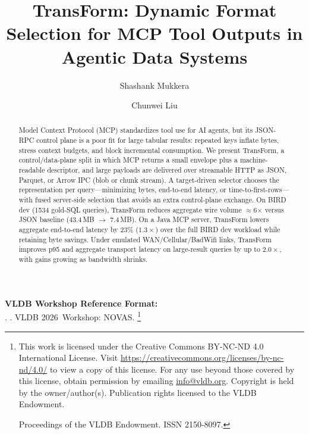 \documentclass[sigconf, nonacm]{acmart}
\newcommand{\system}{TransForm}
\newcommand\vldbyear{2026}
\newcommand\vldbworkshop{NOVAS}
\newcommand\vldbauthors{\authors}
\newcommand\vldbtitle{\shorttitle}
\newcommand\vldbpagestyle{plain}
\begin{document}
\title{\system: Dynamic Format Selection for MCP Tool Outputs in Agentic Data Systems}

\author{Shashank Mukkera}

\author{Chunwei Liu}

\begin{abstract}
Model Context Protocol (MCP) standardizes tool use for AI agents, but its JSON-RPC control plane is a poor fit for large tabular results: repeated keys inflate bytes, stress context budgets, and block incremental consumption. We present \system, a control/data-plane split in which MCP returns a small envelope plus a machine-readable descriptor, and large payloads are delivered over streamable HTTP as JSON, Parquet, or Arrow IPC (blob or chunk stream). A target-driven selector chooses the representation per query---minimizing bytes, end-to-end latency, or time-to-first-rows---with fused server-side selection that avoids an extra control-plane exchange. On BIRD dev (1534 gold-SQL queries), \system{} reduces aggregate wire volume $\approx$6$\times$ versus JSON baseline (43.4\,MB $\rightarrow$ 7.4\,MB). On a Java MCP server, \system{} lowers aggregate end-to-end latency by 23\% ($1.3\times$) over the full BIRD dev workload while retaining byte savings. Under emulated WAN/Cellular/BadWifi links, \system{} improves p95 and aggregate transport latency on large-result queries by up to $2.0\times$, with gains growing as bandwidth shrinks.
\end{abstract}

\maketitle

\pagestyle{\vldbpagestyle}
\begingroup\small\noindent\raggedright\textbf{VLDB Workshop Reference Format:}\\
\vldbauthors. \vldbtitle. VLDB \vldbyear\ Workshop: \vldbworkshop.
\endgroup
\begingroup
\renewcommand\thefootnote{}\footnote{\noindent
This work is licensed under the Creative Commons BY-NC-ND 4.0 International License. Visit \url{https://creativecommons.org/licenses/by-nc-nd/4.0/} to view a copy of this license. For any use beyond those covered by this license, obtain permission by emailing \href{mailto:info@vldb.org}{info@vldb.org}. Copyright is held by the owner/author(s). Publication rights licensed to the VLDB Endowment. \\
\raggedright Proceedings of the VLDB Endowment. ISSN 2150-8097.
}\addtocounter{footnote}{-1}\endgroup
\end{document}
